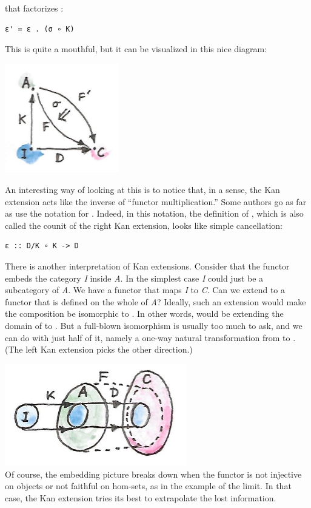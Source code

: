 that factorizes :

\begin{verbatim}
ε' = ε . (σ ∘ K)
\end{verbatim}

This is quite a mouthful, but it can be visualized in this nice diagram:

\includegraphics[width=1.95833in]{images/kan7.jpg}

An interesting way of looking at this is to notice that, in a sense, the
Kan extension acts like the inverse of ``functor multiplication.'' Some
authors go as far as use the notation  for .
Indeed, in this notation, the definition of , which is also
called the counit of the right Kan extension, looks like simple
cancellation:

\begin{verbatim}
ε :: D/K ∘ K -> D
\end{verbatim}

There is another interpretation of Kan extensions. Consider that the
functor  embeds the category \emph{I} inside \emph{A}. In the
simplest case \emph{I} could just be a subcategory of \emph{A}. We have
a functor  that maps \emph{I} to \emph{C}. Can we extend
 to a functor  that is defined on the whole of
\emph{A}? Ideally, such an extension would make the composition
 be isomorphic to . In other words, 
would be extending the domain of  to . But a
full-blown isomorphism is usually too much to ask, and we can do with
just half of it, namely a one-way natural transformation  from
 to . (The left Kan extension picks the other
direction.)

\includegraphics[width=3.12500in]{images/kan6.jpg}\\
Of course, the embedding picture breaks down when the functor 
is not injective on objects or not faithful on hom-sets, as in the
example of the limit. In that case, the Kan extension tries its best to
extrapolate the lost information.


